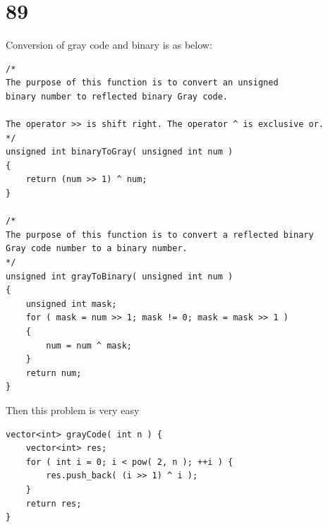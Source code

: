 \documentclass[12pt,a4paper]{article}
\begin{document}
\section{89}
Conversion of gray code and binary is as below:
\begin{lstlisting}
/*
The purpose of this function is to convert an unsigned
binary number to reflected binary Gray code.

The operator >> is shift right. The operator ^ is exclusive or.
*/
unsigned int binaryToGray( unsigned int num )
{
	return (num >> 1) ^ num;
}

/*
The purpose of this function is to convert a reflected binary
Gray code number to a binary number.
*/
unsigned int grayToBinary( unsigned int num )
{
	unsigned int mask;
	for ( mask = num >> 1; mask != 0; mask = mask >> 1 )
	{
		num = num ^ mask;
	}
	return num;
}
\end{lstlisting}
Then this problem is very easy
\begin{lstlisting}
vector<int> grayCode( int n ) {
	vector<int> res;
	for ( int i = 0; i < pow( 2, n ); ++i ) {
		res.push_back( (i >> 1) ^ i );
	}
	return res;
}
\end{lstlisting}
\end{document}
